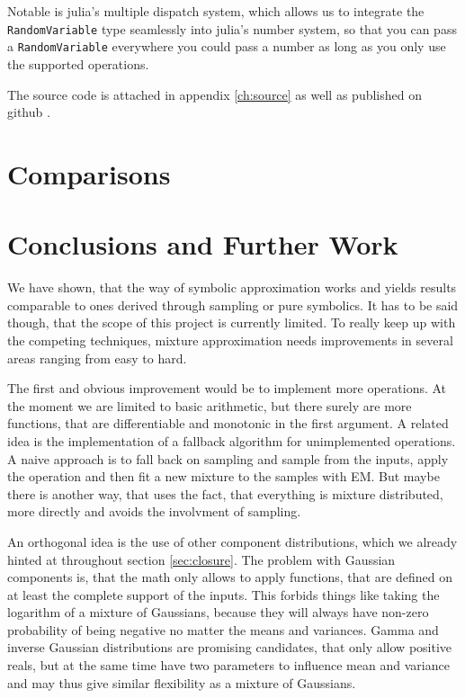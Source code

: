 \documentclass[11pt,a4paper]{book}
\newcommand{\injulia}[1]{\texttt{#1}}
\begin{document}
Notable is julia's multiple dispatch system, which allows us to integrate the
\injulia{RandomVariable} type seamlessly into julia's number system, so that you
can pass a \injulia{RandomVariable} everywhere you could pass a number as long
as you only use the supported operations.

The source code is attached in appendix \ref{ch:source} as well as published on
github \cite{github}.

\chapter{Comparisons}
\label{ch:comparisons}

\chapter{Conclusions and Further Work}
\label{ch:conclusions}

We have shown, that the way of symbolic approximation works and yields results
comparable to ones derived through sampling or pure symbolics. It has to be said
though, that the scope of this project is currently limited. To really keep up
with the competing techniques, mixture approximation needs improvements in
several areas ranging from easy to hard.

The first and obvious improvement would be to implement more operations. At the
moment we are limited to basic arithmetic, but there surely are more functions,
that are differentiable and monotonic in the first argument. A related idea is
the implementation of a fallback algorithm for unimplemented operations. A naive
approach is to fall back on sampling and sample from the inputs, apply the
operation and then fit a new mixture to the samples with EM. But maybe there is
another way, that uses the fact, that everything is mixture distributed, more
directly and avoids the involvment of sampling.

An orthogonal idea is the use of other component distributions, which we already
hinted at throughout section \ref{sec:closure}. The problem with Gaussian
components is, that the math only allows to apply functions, that are defined on
at least the complete support of the inputs. This forbids things like taking the
logarithm of a mixture of Gaussians, because they will always have non-zero
probability of being negative no matter the means and variances. Gamma and
inverse Gaussian distributions are promising candidates, that only allow
positive reals, but at the same time have two parameters to influence mean and
variance and may thus give similar flexibility as a mixture of Gaussians.
\end{document}
